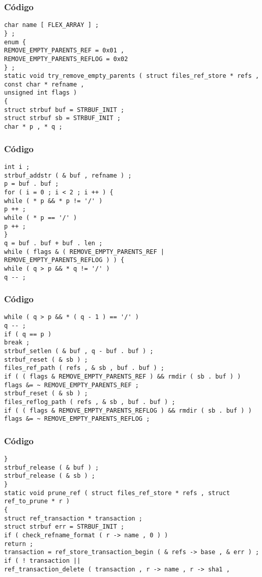 \documentclass{beamer}
\begin{document}
\begin{frame}[fragile]
\frametitle{C\'odigo}
\begin{verbatim}
char name [ FLEX_ARRAY ] ; 
} ; 
enum { 
REMOVE_EMPTY_PARENTS_REF = 0x01 , 
REMOVE_EMPTY_PARENTS_REFLOG = 0x02 
} ; 
static void try_remove_empty_parents ( struct files_ref_store * refs , 
const char * refname , 
unsigned int flags ) 
{ 
struct strbuf buf = STRBUF_INIT ; 
struct strbuf sb = STRBUF_INIT ; 
char * p , * q ; 
\end{verbatim}
\end{frame}
\begin{frame}[fragile]
\frametitle{C\'odigo}
\begin{verbatim}
int i ; 
strbuf_addstr ( & buf , refname ) ; 
p = buf . buf ; 
for ( i = 0 ; i < 2 ; i ++ ) { 
while ( * p && * p != '/' ) 
p ++ ; 
while ( * p == '/' ) 
p ++ ; 
} 
q = buf . buf + buf . len ; 
while ( flags & ( REMOVE_EMPTY_PARENTS_REF | REMOVE_EMPTY_PARENTS_REFLOG ) ) { 
while ( q > p && * q != '/' ) 
q -- ; 
\end{verbatim}
\end{frame}
\begin{frame}[fragile]
\frametitle{C\'odigo}
\begin{verbatim}
while ( q > p && * ( q - 1 ) == '/' ) 
q -- ; 
if ( q == p ) 
break ; 
strbuf_setlen ( & buf , q - buf . buf ) ; 
strbuf_reset ( & sb ) ; 
files_ref_path ( refs , & sb , buf . buf ) ; 
if ( ( flags & REMOVE_EMPTY_PARENTS_REF ) && rmdir ( sb . buf ) ) 
flags &= ~ REMOVE_EMPTY_PARENTS_REF ; 
strbuf_reset ( & sb ) ; 
files_reflog_path ( refs , & sb , buf . buf ) ; 
if ( ( flags & REMOVE_EMPTY_PARENTS_REFLOG ) && rmdir ( sb . buf ) ) 
flags &= ~ REMOVE_EMPTY_PARENTS_REFLOG ; 
\end{verbatim}
\end{frame}
\begin{frame}[fragile]
\frametitle{C\'odigo}
\begin{verbatim}
} 
strbuf_release ( & buf ) ; 
strbuf_release ( & sb ) ; 
} 
static void prune_ref ( struct files_ref_store * refs , struct ref_to_prune * r ) 
{ 
struct ref_transaction * transaction ; 
struct strbuf err = STRBUF_INIT ; 
if ( check_refname_format ( r -> name , 0 ) ) 
return ; 
transaction = ref_store_transaction_begin ( & refs -> base , & err ) ; 
if ( ! transaction || 
ref_transaction_delete ( transaction , r -> name , r -> sha1 , 
\end{verbatim}
\end{frame}
\end{document}
